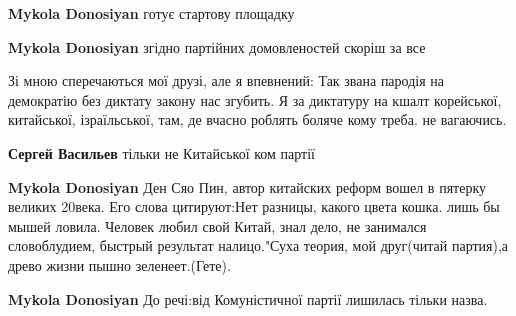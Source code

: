 \begin{itemize}
\begin{itemize}
\textbf{Mykola Donosiyan} готує стартову площадку

 
\textbf{Mykola Donosiyan} згідно партійних домовленостей скоріш за все
\end{itemize}

 

Зі мною сперечаються мої друзі, але я впевнений: Так звана пародія на демократію
без диктату закону нас згубить. Я за диктатуру на кшалт
корейської, китайської, ізраїльської, там, де вчасно роблять боляче кому треба. не
вагаючись.

\begin{itemize}
 
\textbf{Сергей Васильев} тільки не Китайської ком партії

 
\textbf{Mykola Donosiyan} Ден Сяо Пин, автор китайских реформ вошел в пятерку
великих 20века. Его слова цитируют:Нет разницы, какого цвета кошка. лишь бы мышей
ловила. Человек любил свой Китай, знал дело, не занимался словоблудием, быстрый
результат налицо."Суха теория, мой друг(читай партия),а древо жизни пышно
зеленеет.(Гете).

 
\textbf{Mykola Donosiyan} До речі:від Комуністичної партії лишилась тільки назва.
\end{itemize}


\end{itemize}
